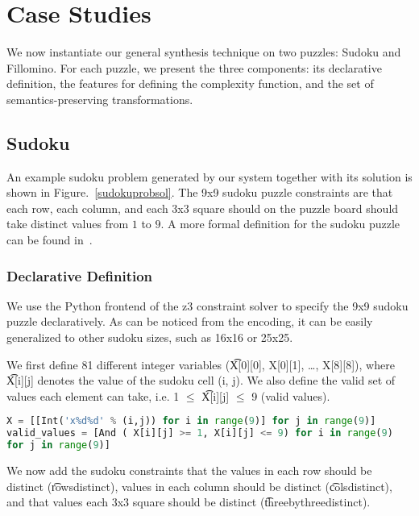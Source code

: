 \section{Case Studies}

We now instantiate our general synthesis technique on two puzzles:
Sudoku and Fillomino. For each puzzle, we present the three
components: its declarative definition, the features for defining the
complexity function, and the set of semantics-preserving
transformations.


\subsection{Sudoku}

An example sudoku problem generated by our system together with its
solution is shown in Figure.~\ref{sudokuprobsol}. The 9x9 sudoku puzzle constraints are that each row, each column, and each 3x3 square should on the puzzle board should take distinct values from $1$ to $9$. A more formal definition for the sudoku puzzle can be found in~\cite{sudokudef}.

\subsubsection{Declarative Definition}
We use the Python frontend of the z3 constraint solver to specify the 9x9
sudoku puzzle declaratively. As can be noticed from the encoding, it
can be easily generalized to other sudoku sizes, such as 16x16 or
25x25.

We first define 81 different integer variables (\t{X[0][0], X[0][1], \ldots,
X[8][8]}), where \t{X[i][j]} denotes the value of the sudoku cell (i, j). We
also define the valid set of values each element can take, i.e. 1 $\leq$
\t{X[i][j]} $\leq$ 9 (valid values).

\singlespace
\begin{lstlisting}[language=python, frame = single]
X = [[Int('x%d%d' % (i,j)) for i in range(9)] for j in range(9)]
valid_values = [And ( X[i][j] >= 1, X[i][j] <= 9) for i in range(9)
for j in range(9)]
\end{lstlisting}
\doublespace

We now add the sudoku constraints that the values in each row should be
distinct (\t{rows\textunderscore distinct}), values in each column should be distinct
(\t{cols\textunderscore distinct}), and that values each 3x3 square should be distinct
(\t{three\textunderscore by\textunderscore three\textunderscore distinct}).

